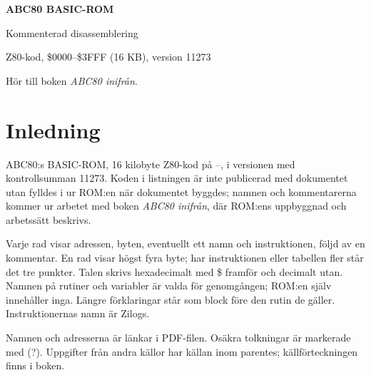\documentclass[10pt,oneside]{report}
\begin{document}
\hypersetup{pageanchor=false}
\begin{titlepage}
\centering
\vspace*{50mm}
{\Huge\bfseries ABC80 BASIC-ROM\par}
\vspace{6mm}
{\LARGE Kommenterad disassemblering\par}
\vspace{14mm}
{\large Z80-kod, \$0000--\$3FFF (16 KB), version 11273\par}
\vfill
{\small Hör till boken \emph{ABC80 inifrån}.\par}
\end{titlepage}
\hypersetup{pageanchor=true}
\tableofcontents
\cleardoublepage{}

\chapter{Inledning}
\par\noindent ABC80:s BASIC-ROM, 16 kilobyte Z80-kod på –, i versionen med kontrollsumman 11273. Koden i listningen är inte publicerad med dokumentet utan fylldes i ur ROM:en när dokumentet byggdes; namnen och kommentarerna kommer ur arbetet med boken \emph{ABC80 inifrån}, där ROM:ens uppbyggnad och arbetssätt beskrivs.\par
\par\noindent Varje rad visar adressen, byten, eventuellt ett namn och instruktionen, följd av en kommentar. En rad visar högst fyra byte; har instruktionen eller tabellen fler står det tre punkter. Talen skrivs hexadecimalt med \$ framför och decimalt utan. Namnen på rutiner och variabler är valda för genomgången; ROM:en själv innehåller inga. Längre förklaringar står som block före den rutin de gäller. Instruktionernas namn är Zilogs.\par
\par\noindent Namnen och adresserna är länkar i PDF-filen. Osäkra tolkningar är markerade med (?). Uppgifter från andra källor har källan inom parentes; källförteckningen finns i boken.\par
\end{document}
